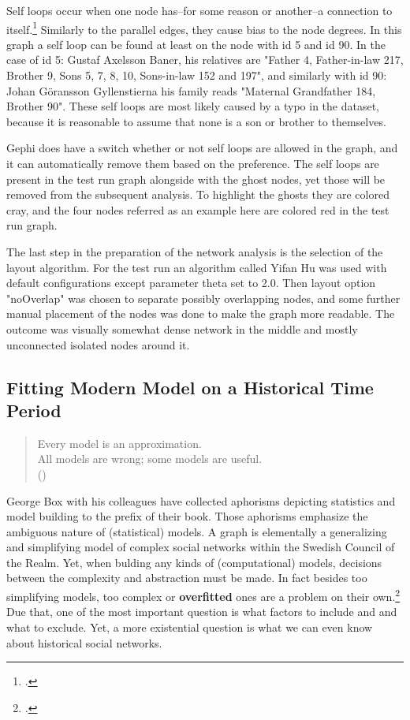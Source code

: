 Self loops occur when one node has–for some reason or another–a connection to itself.\footcite[p. 13.]{RajPM2018} Similarly to the parallel edges, they cause bias to the node degrees. In this graph a self loop can be found at least on the node with id 5 and id 90. In the case of id 5: Gustaf Axelsson Baner, his relatives are "Father 4, Father-in-law 217, Brother 9, Sons 5, 7, 8, 10, Sons-in-law 152 and 197", and similarly with id 90: Johan Göransson Gyllenstierna his family reads "Maternal Grandfather 184, Brother 90". These self loops are most likely caused by a typo in the dataset, because it is reasonable to assume that none is a son or brother to themselves.
 
Gephi does have a switch whether or not self loops are allowed in the graph, and it can automatically remove them based on the preference. The self loops are present in the test run graph alongside with the ghost nodes, yet those will be removed from the subsequent analysis. To highlight the ghosts they are colored cray, and the four nodes referred as an example here are colored red in the test run graph.

The last step in the preparation of the network analysis is the selection of the layout algorithm. For the test run an algorithm called Yifan Hu was used with default configurations except parameter theta set to 2.0. Then layout option "noOverlap" was chosen to separate possibly overlapping nodes, and some further manual placement of the nodes was done to make the graph more readable. The outcome was visually somewhat dense network in the middle and mostly unconnected isolated nodes around it. 

\subsection{Fitting Modern Model on a Historical Time Period}
\label{background}
\begin{quote}
	Every model is an approximation.\\
	All models are wrong; some models are useful.\\
	(\cite[prefix]{statisticsfor})
\end{quote}

George Box with his colleagues have collected aphorisms depicting statistics and model building to the prefix of their book. Those aphorisms emphasize the ambiguous nature of (statistical) models. A graph is elementally a generalizing and simplifying model of complex social networks within the Swedish Council of the Realm. Yet, when bulding any kinds of (computational) models, decisions between the complexity and abstraction must be made. In fact besides too simplifying models, too complex or \textbf{overfitted} ones are a problem on their own.\footcite["overfitting: a model with no constraints can be fit arbitrarily close to data, yielding a low prediction error on observed data but noisy inferences
and poor performance on new cases" p. 464.]{gellmanEtAl2021} Due that, one of the most important question is what factors to include and and what to exclude. Yet, a more existential question is what we can even know about historical social networks. 

